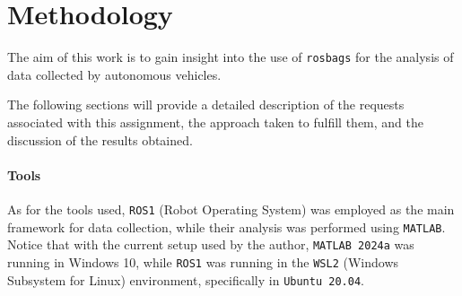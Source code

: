 \section{Methodology}
\label{sec:methodology}

The aim of this work is to gain insight into the use of \texttt{rosbags} for the analysis of data collected by autonomous vehicles.

The following sections will provide a detailed description of the requests associated with this assignment, the approach taken to fulfill them, and the discussion of the results obtained.

\paragraph{Tools}

As for the tools used, \texttt{ROS1} (Robot Operating System) was employed as the main framework for data collection, while their analysis was performed using \texttt{MATLAB}.
Notice that with the current setup used by the author, \texttt{MATLAB 2024a} was running in Windows 10, while \texttt{ROS1} was running in the \texttt{WSL2} (Windows Subsystem for Linux) environment, specifically in \texttt{Ubuntu 20.04}.
